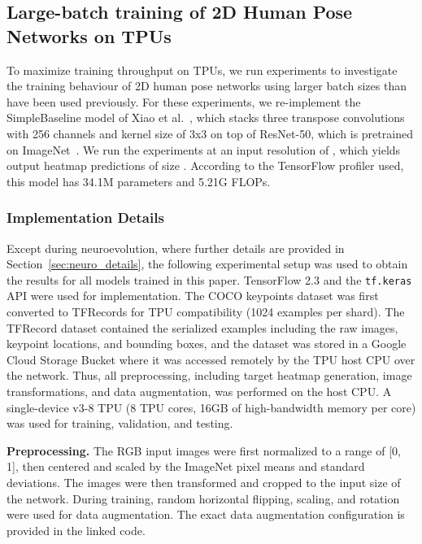\documentclass[final]{cvpr}
\begin{document}
\vspace{-2pt}
\subsection{Large-batch training of 2D Human Pose\\Networks on TPUs}
\vspace{-2pt}
\label{sec:large_batch}
To maximize training throughput on TPUs, we run experiments to investigate the training behaviour of 2D human pose networks using larger batch sizes than have been used previously. For these experiments, we re-implement the SimpleBaseline model of Xiao et al.\ \cite{xiao2018simple}, which stacks three transpose convolutions with 256 channels and kernel size of 3x3 on top of ResNet-50, which is pretrained on ImageNet~\cite{krizhevsky2012imagenet}. We run the experiments at an input resolution of , which yields output heatmap predictions of size . According to the TensorFlow profiler used, this model has 34.1M parameters and 5.21G FLOPs.

\vspace{-6pt}
\subsubsection{Implementation Details}
\vspace{-2pt}
\label{sec:tpu_details}
Except during neuroevolution, where further details are provided in Section~\ref{sec:neuro_details}, the following experimental setup was used to obtain the results for all models trained in this paper. 
TensorFlow 2.3 and the \texttt{tf.keras} API were used for implementation. The COCO keypoints dataset was first converted to TFRecords for TPU compatibility (1024 examples per shard). The TFRecord dataset contained the serialized examples including the raw images, keypoint locations, and bounding boxes, and the dataset was stored in a Google Cloud Storage Bucket where it was accessed remotely by the TPU host CPU over the network. Thus, all preprocessing, including target heatmap generation, image transformations, and data augmentation, was performed on the host CPU. A single-device v3-8 TPU (8 TPU cores, 16GB of high-bandwidth memory per core) was used for training, validation, and testing.



\medskip\noindent\textbf{Preprocessing.} The RGB input images were first normalized to a range of [0, 1], then centered and scaled by the ImageNet pixel means and standard deviations. The images were then transformed and cropped to the input size of the network. During training, random horizontal flipping, scaling, and rotation were used for data augmentation. The exact data augmentation configuration is provided in the linked code.
\end{document}
